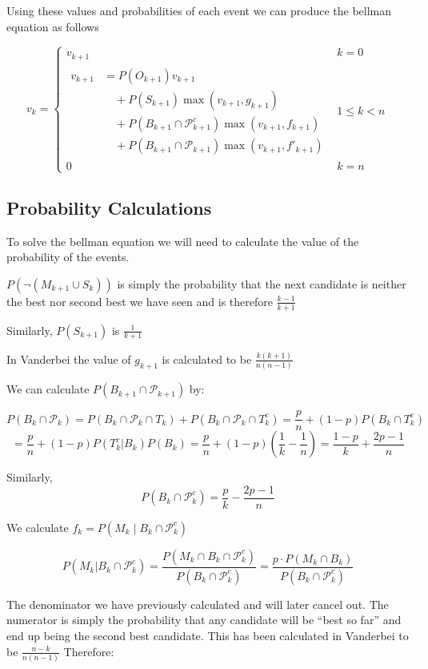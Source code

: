 \documentclass[a4paper,11pt]{article}
\begin{document}
Using these values and probabilities of each event we can produce the bellman equation as follows

$$
v_k = \begin{cases}
  v_{k+1} & k = 0\\
\begin{aligned}
v_{k+1} &= P(O_{k+1}) v_{k+1} \\
      &\quad + P(S_{k+1})\max\left(v_{k+1},g_{k+1}\right) \\
      &\quad + P(B_{k+1} \cap \mathcal{P}_{k+1}^c)\max\left(v_{k+1},f_{k+1}\right) \\
      &\quad + P(B_{k+1} \cap \mathcal{P}_{k+1})\max\left(v_{k+1},f'_{k+1}\right)
\end{aligned} & 1\le k < n\\
 0 & k = n
\end{cases}
$$

\subsection{Probability Calculations}

To solve the bellman equation we will need to calculate the value of the probability of the events.

$P(\neg(M_{k+1}\cup S_k))$ is simply the probability that the next candidate is neither the best nor second best we have seen and is therefore $\frac{k-1}{k+1}$

Similarly, $P(S_{k+1})$ is $\frac{1}{k+1}$

In Vanderbei the value of $g_{k+1}$ is calculated to be $\frac{k(k+1)}{n(n-1)}$

We can calculate $P(B_{k+1} \cap \mathcal{P}_{k+1})$ by:

$$
P(B_k \cap \mathcal{P}_k) = P(B_k \cap \mathcal{P}_k \cap T_k) + P(B_k \cap \mathcal{P}_k \cap T_k^c) = \frac{p}{n} + (1-p)P(B_k \cap T_k^c)
$$
$$
=\frac{p}{n} + (1-p)P(T_k^c|B_k)P(B_k) = \frac{p}{n} + (1-p)(\frac{1}{k}-\frac{1}{n}) = \frac{1-p}{k} + \frac{2p-1}{n}
$$ 

Similarly, 
$$
P(B_{k} \cap \mathcal{P}_{k}^c) = \frac{p}{k} - \frac{2p-1}{n} 
$$

We calculate $f_k = P(M_k \mid B_k\cap \mathcal{P}^c_k )$

$$
P(M_k| B_k\cap \mathcal{P}^c_k ) = \frac{P(M_k\cap B_k\cap \mathcal{P}^c_k )}{P(B_k\cap \mathcal{P}^c_k)} = \frac{p \cdot P(M_k\cap B_k )}{P(B_k\cap \mathcal{P}^c_k)}
$$

The denominator we have previously calculated and will later cancel out. The numerator is simply the probability that any candidate will be ``best so far'' and end up being the second best candidate. This has been calculated in Vanderbei to be $\frac{n-k}{n(n-1)}$ Therefore:
\end{document}
